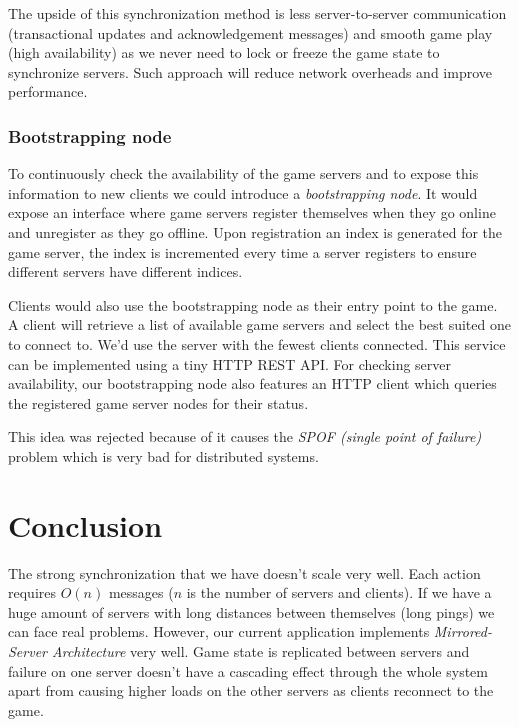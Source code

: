 \documentclass[a4paper]{article}
\begin{document}
The upside of this synchronization method is less server-to-server communication (transactional updates and acknowledgement messages) and smooth game play (high availability) as we never need to lock or freeze the game state to synchronize servers. Such approach will reduce network overheads and improve performance.

\subsubsection{Bootstrapping node} \label{section:bootstrapping node}
To continuously check the availability of the game servers and to expose this information to new clients we could introduce a \emph{bootstrapping node}. It would expose an interface where game servers register themselves when they go online and unregister as they go offline. Upon registration an index is generated for the game server, the index is incremented every time a server registers to ensure different servers have different indices.

Clients would also use the bootstrapping node as their entry point to the game. A client will retrieve a list of available game servers and select the best suited one to connect to. We'd use the server with the fewest clients connected. This service can be implemented using a tiny HTTP REST API. For checking server availability, our bootstrapping node also features an HTTP client which queries the registered game server nodes for their status.

This idea was rejected because of it causes the \emph{SPOF (single point of failure)} problem which is very bad for distributed systems.

\section{Conclusion}
The strong synchronization that we have doesn't scale very well. Each action requires $O(n)$ messages ($n$ is the number of servers and clients). If we have a huge amount of servers with long distances between themselves (long pings) we can face real problems. However, our current application implements \emph{Mirrored-Server Architecture} very well. Game state is replicated between servers and failure on one server doesn't have a cascading effect through the whole system apart from causing higher loads on the other servers as clients reconnect to the game.

\pagebreak
\appendix
\end{document}
